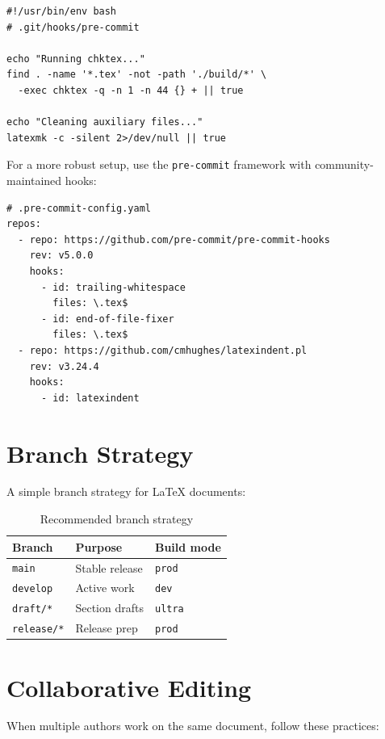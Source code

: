 \begin{verbatim}
#!/usr/bin/env bash
# .git/hooks/pre-commit

echo "Running chktex..."
find . -name '*.tex' -not -path './build/*' \
  -exec chktex -q -n 1 -n 44 {} + || true

echo "Cleaning auxiliary files..."
latexmk -c -silent 2>/dev/null || true
\end{verbatim}

For a more robust setup, use the \texttt{pre-commit} framework with
community-maintained hooks:

\begin{verbatim}
# .pre-commit-config.yaml
repos:
  - repo: https://github.com/pre-commit/pre-commit-hooks
    rev: v5.0.0
    hooks:
      - id: trailing-whitespace
        files: \.tex$
      - id: end-of-file-fixer
        files: \.tex$
  - repo: https://github.com/cmhughes/latexindent.pl
    rev: v3.24.4
    hooks:
      - id: latexindent
\end{verbatim}

\section{Branch Strategy}

A simple branch strategy for LaTeX documents:

\begin{table}[htbp]
  \centering
  \caption{Recommended branch strategy}
  \label{tab:git-branches}
  \begin{tabular}{@{}llp{}@{}}
    \toprule
    \textbf{Branch} & \textbf{Purpose} & \textbf{Build mode} \\
    \midrule
    \texttt{main}     & Stable release   & \texttt{prod} \\
    \texttt{develop}  & Active work      & \texttt{dev} \\
    \texttt{draft/*}  & Section drafts   & \texttt{ultra} \\
    \texttt{release/*} & Release prep    & \texttt{prod} \\
    \bottomrule
  \end{tabular}
\end{table}

\section{Collaborative Editing}

When multiple authors work on the same document, follow these practices:

